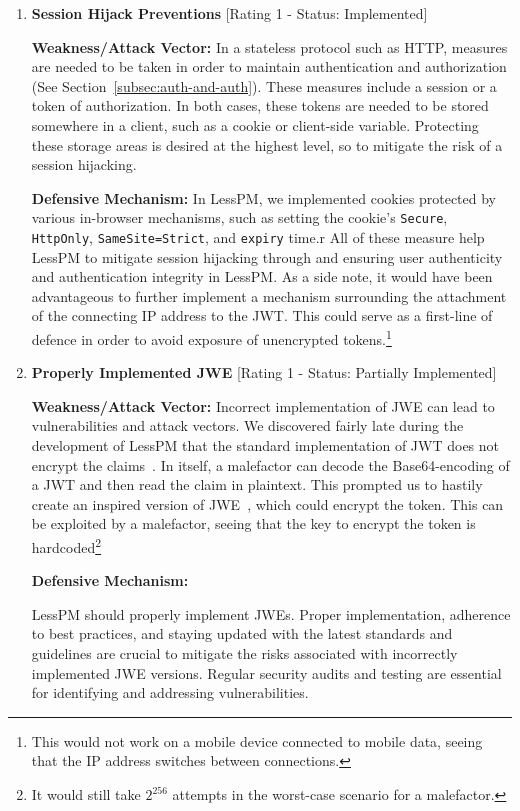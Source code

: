 \begin{enumerate}[label=$\blacktriangleright$]
  \item \textbf{Session Hijack Preventions} [Rating 1 - Status: Implemented]

  \textbf{Weakness/Attack Vector:}
  In a stateless protocol such as HTTP, measures are needed to be taken in
  order to maintain authentication and authorization (See
  Section~\ref{subsec:auth-and-auth}).
  These measures include a session or a token of authorization.
  In both cases, these tokens are needed to be stored somewhere in a client,
  such as a cookie or client-side variable.
  Protecting these storage areas is desired at the highest level, so to
  mitigate the risk of a session hijacking.

  \textbf{Defensive Mechanism:}
  In LessPM, we implemented cookies protected by various in-browser
  mechanisms, such as setting the cookie's \texttt{Secure}, \texttt{HttpOnly},
  \texttt{SameSite=Strict}, and \texttt{expiry} time.r
  All of these measure help LessPM to mitigate session hijacking through and
  ensuring user authenticity and authentication integrity in LessPM\@.
  As a side note, it would have been advantageous to further implement a
  mechanism surrounding the attachment of the connecting IP address to the
  JWT\@.
  This could serve as a first-line of defence in order to avoid exposure of
  unencrypted tokens.\footnote{
    This would not work on a mobile device connected to mobile data,
    seeing that the IP address switches between connections.
  }

  \item \textbf{Properly Implemented JWE} [Rating 1 - Status: Partially
  Implemented]

  \textbf{Weakness/Attack Vector:}
  Incorrect implementation of JWE can lead to vulnerabilities and attack
  vectors.
  We discovered fairly late during the development of LessPM that the
  standard implementation of JWT does not encrypt the claims~\cite{RFC7519}.
  In itself, a malefactor can decode the Base64-encoding of a JWT and then
  read the claim in plaintext.
  This prompted us to hastily create an inspired version of JWE~\cite{rfc7516
  }, which could encrypt the token.
  This can be exploited by a malefactor, seeing that the key to encrypt the
  token is hardcoded\footnote{
    It would still take $2^{256}$ attempts in the worst-case scenario for a
    malefactor.
  }

  \textbf{Defensive Mechanism:}

  LessPM should properly implement JWEs.
  Proper implementation, adherence to best practices, and staying updated with
  the latest standards and guidelines are crucial to mitigate the risks
  associated with incorrectly implemented JWE versions.
  Regular security audits and testing are essential for identifying and
  addressing vulnerabilities.
  

\end{enumerate}
